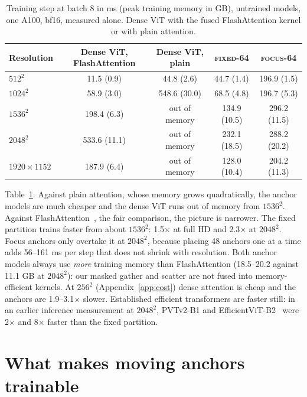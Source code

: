 \documentclass[10pt]{article}
\newcommand{\focus}{\textsc{focus}}
\newcommand{\fixed}{\textsc{fixed}}
\begin{document}
\begin{table}[t]
\centering
\caption{Training step at batch 8 in ms (peak training memory in GB), untrained models, one A100,
bf16, measured alone. Dense ViT with the fused FlashAttention kernel or with plain attention.}
\label{tab:cost}
\begin{tabular}{lcccc}
\toprule
Resolution & Dense ViT, FlashAttention & Dense ViT, plain & \fixed-64 & \focus-64 \\
\midrule
$512^2$ & 11.5 (0.9) & 44.8 (2.6) & 44.7 (1.4) & 196.9 (1.5) \\
$1024^2$ & 58.9 (3.0) & 548.6 (30.0) & 68.5 (4.8) & 196.7 (5.3) \\
$1536^2$ & 198.4 (6.3) & out of memory & 134.9 (10.5) & 296.2 (11.5) \\
$2048^2$ & 533.6 (11.1) & out of memory & 232.1 (18.5) & 288.2 (20.2) \\
$1920\times1152$ & 187.9 (6.4) & out of memory & 128.0 (10.4) & 204.2 (11.3) \\
\bottomrule
\end{tabular}
\end{table}

Table~\ref{tab:cost}. Against plain attention, whose memory grows quadratically, the anchor models
are much cheaper and the dense ViT runs out of memory from $1536^2$. Against
FlashAttention~\citep{dao2022flashattention}, the fair comparison, the picture is narrower. The
fixed partition trains faster from about $1536^2$: 1.5$\times$ at full HD and 2.3$\times$ at
$2048^2$. Focus anchors only overtake it at $2048^2$, because placing 48 anchors one at a time
adds 56--161 ms per step that does not shrink with resolution. Both anchor models always use
\emph{more} training memory than FlashAttention (18.5--20.2 against 11.1 GB at $2048^2$): our
masked gather and scatter are not fused into memory-efficient kernels. At $256^2$
(Appendix~\ref{app:cost}) dense attention is cheap and the anchors are 1.9--3.1$\times$ slower.
Established efficient transformers are faster still: in an earlier inference measurement at
$2048^2$, PVTv2-B1 and EfficientViT-B2~\citep{cai2023efficientvit} were 2$\times$ and 8$\times$
faster than the fixed partition.

\section{What makes moving anchors trainable}
\label{sec:stability}
\end{document}
